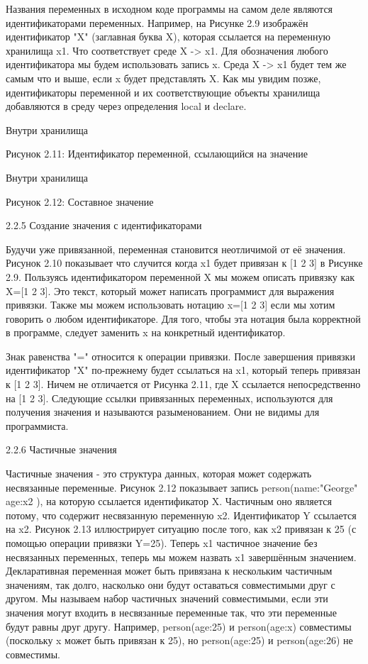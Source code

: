 Названия переменных в исходном коде программы на самом деле являются идентификаторами переменных. Например, на Рисунке 2.9 изображён идентификатор "X" (заглавная буква X), которая ссылается на переменную хранилища x1. Что соответствует среде {X -> x1}. Для обозначения любого идентификатора мы будем использовать запись x. Среда {X -> x1} будет тем же самым что и выше, если x будет представлять X. Как мы увидим позже, идентификаторы переменной и их соответствующие объекты хранилища добавляются в среду через определения local и declare.

Внутри хранилища

Рисунок 2.11: Идентификатор переменной, ссылающийся на значение

Внутри хранилища

Рисунок 2.12: Составное значение

2.2.5 Создание значения с идентификаторами

Будучи уже привязанной, переменная становится неотличимой от её значения. Рисунок 2.10 показывает что случится когда x1 будет привязан к [1 2 3] в Рисунке 2.9. Пользуясь идентификатором переменной X мы можем описать привязку как X=[1 2 3]. Это текст, который может написать программист для выражения привязки. Также мы можем использовать нотацию x=[1 2 3] если мы хотим говорить о любом идентификаторе. Для того, чтобы эта нотация была корректной в программе, следует заменить x на конкретный идентификатор.

Знак равенства "=" относится к операции привязки. После завершения привязки идентификатор "X" по-прежнему будет ссылаться на x1, который теперь привязан к [1 2 3]. Ничем не отличается от Рисунка 2.11, где X ссылается непосредственно на [1 2 3]. Следующие ссылки привязанных переменных, используются для получения значения и называются разыменованием. Они не видимы для программиста.

2.2.6 Частичные значения

Частичные значения - это структура данных, которая может содержать несвязанные переменные. Рисунок 2.12 показывает запись person(name:"George" age:x2 ), на которую ссылается идентификатор X. Частичным оно является потому, что содержит несвязанную переменную x2. Идентификатор Y ссылается на x2. Рисунок 2.13 иллюстрирует ситуацию после того, как x2 привязан к 25 (с помощью операции привязки Y=25). Теперь x1 частичное значение без несвязанных переменных, теперь мы можем назвать x1 завершённым значением. Декларативная переменная может быть привязана к нескольким частичным значениям, так долго, насколько они будут оставаться совместимыми друг с другом. Мы называем набор частичных значений совместимыми, если эти значения могут входить в несвязанные переменные так, что эти переменные будут равны друг другу. Например, person(age:25) и person(age:x) совместимы (поскольку x может быть привязан к 25), но person(age:25) и person(age:26) не совместимы.

